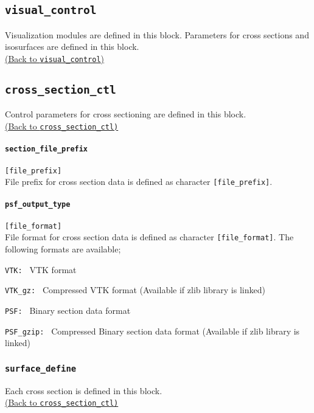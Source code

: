 \subsection{\tt visual\_control}
\label{href_t:visual_control}
Visualization modules are defined in this block. Parameters for cross sections and isosurfaces are defined in this block. \\
\hyperref[href_i:visual_control]{(Back to {\tt visual\_control})}

%
%
\subsection{\tt cross\_section\_ctl}
\label{href_t:cross_section_ctl}
Control parameters for cross sectioning are defined in this block. \\
\hyperref[href_i:cross_section_ctl]{(Back to {\tt cross\_section\_ctl)}}

\paragraph{\tt section\_file\_prefix}
\label{href_t:section_file_prefix}
\verb|[file_prefix]| \\
File prefix for cross section data is defined as character \verb|[file_prefix]|.

\paragraph{\tt psf\_output\_type}
\label{href_t:psf_output_type}
\verb|[file_format]| \\
File format for cross section data is defined as character \verb|[file_format]|. The following formats are available;
\begin{description}
\item{\tt VTK: }               VTK format
\item{\tt VTK\_gz: }           Compressed VTK format (Available if zlib library is linked)
\item{\tt PSF: }               Binary section data format
\item{\tt PSF\_gzip: }         Compressed Binary section data format (Available if zlib library is linked)
\end{description}

\subsubsection{\tt surface\_define}
\label{href_t:surface_define}
Each cross section is defined in this block. \\
\hyperref[href_i:cross_section_ctl]{(Back to {\tt cross\_section\_ctl)}} \\

